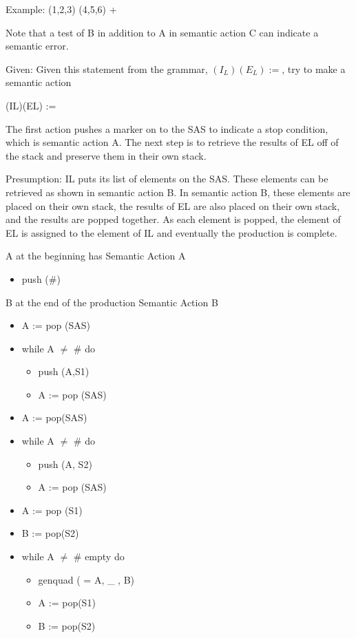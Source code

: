 \documentclass[11pt]{article}
\begin{document}
Example: (1,2,3) (4,5,6) + 

Note that a test of B in addition to A in semantic action C can indicate a semantic error.

Given:
Given this statement from the grammar,  $(I_L)(E_L) :=$, try to make a semantic action

(IL)(EL) :=

The first action pushes a marker on to the SAS to indicate a stop condition, which is semantic action A.  The next step is to retrieve the results of EL off of the stack and preserve them in their own stack.

Presumption:  IL puts its list of elements on the SAS.  These elements can be retrieved as shown in semantic action B.  In semantic action B, these elements are placed on their own stack, the results of EL are also placed on their own stack, and the results are popped together.  As each element is popped, the element of EL is assigned to the element of IL and eventually the production is complete.  


A at the beginning has
Semantic Action A
\begin{itemize}
\item push (\#)
\end{itemize}

B at the end of the production
Semantic Action B
\begin{itemize}
\item A := pop (SAS)
\item while A $\neq$ \# do 
\begin{itemize}
\item push (A,S1)
\item A := pop (SAS)
\end{itemize}
\item A := pop(SAS)
\item while A $\neq$ \# do
\begin{itemize}
\item push (A, S2)
\item A := pop (SAS)
\end{itemize}
\item A := pop (S1)
\item B := pop(S2)
\item while A $\neq$ \# empty do
\begin{itemize}
\item genquad ( = A, \_ , B)
\item A := pop(S1)
\item B := pop(S2)
\end{itemize}

\end{itemize}
\end{document}
